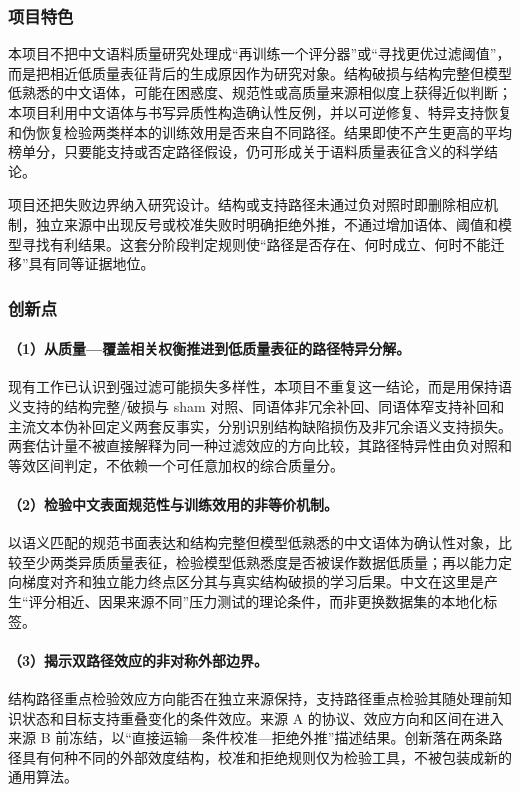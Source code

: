 \justifying
\NSFCBodyText

\subsubsection{项目特色}

本项目不把中文语料质量研究处理成“再训练一个评分器”或“寻找更优过滤阈值”，而是把相近低质量表征背后的生成原因作为研究对象。结构破损与结构完整但模型低熟悉的中文语体，可能在困惑度、规范性或高质量来源相似度上获得近似判断；本项目利用中文语体与书写异质性构造确认性反例，并以可逆修复、特异支持恢复和伪恢复检验两类样本的训练效用是否来自不同路径。结果即使不产生更高的平均榜单分，只要能支持或否定路径假设，仍可形成关于语料质量表征含义的科学结论。

项目还把失败边界纳入研究设计。结构或支持路径未通过负对照时即删除相应机制，独立来源中出现反号或校准失败时明确拒绝外推，不通过增加语体、阈值和模型寻找有利结果。这套分阶段判定规则使“路径是否存在、何时成立、何时不能迁移”具有同等证据地位。

\subsubsection{创新点}

\paragraph{（1）从质量—覆盖相关权衡推进到低质量表征的路径特异分解。}现有工作已认识到强过滤可能损失多样性，本项目不重复这一结论，而是用保持语义支持的结构完整/破损与 sham 对照、同语体非冗余补回、同语体窄支持补回和主流文本伪补回定义两套反事实，分别识别结构缺陷损伤及非冗余语义支持损失。两套估计量不被直接解释为同一种过滤效应的方向比较，其路径特异性由负对照和等效区间判定，不依赖一个可任意加权的综合质量分。

\paragraph{（2）检验中文表面规范性与训练效用的非等价机制。}以语义匹配的规范书面表达和结构完整但模型低熟悉的中文语体为确认性对象，比较至少两类异质质量表征，检验模型低熟悉度是否被误作数据低质量；再以能力定向梯度对齐和独立能力终点区分其与真实结构破损的学习后果。中文在这里是产生“评分相近、因果来源不同”压力测试的理论条件，而非更换数据集的本地化标签。

\paragraph{（3）揭示双路径效应的非对称外部边界。}结构路径重点检验效应方向能否在独立来源保持，支持路径重点检验其随处理前知识状态和目标支持重叠变化的条件效应。来源 A 的协议、效应方向和区间在进入来源 B 前冻结，以“直接运输—条件校准—拒绝外推”描述结果。创新落在两条路径具有何种不同的外部效度结构，校准和拒绝规则仅为检验工具，不被包装成新的通用算法。
